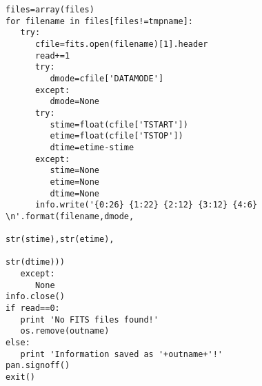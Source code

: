 \begin{verbatim}
files=array(files)
for filename in files[files!=tmpname]:
   try:
      cfile=fits.open(filename)[1].header
      read+=1
      try:
         dmode=cfile['DATAMODE']
      except:
         dmode=None
      try:
         stime=float(cfile['TSTART'])
         etime=float(cfile['TSTOP'])
         dtime=etime-stime
      except:
         stime=None
         etime=None
         dtime=None
      info.write('{0:26} {1:22} {2:12} {3:12} {4:6} \n'.format(filename,dmode,
                                                               str(stime),str(etime),
                                                               str(dtime)))
   except:
      None
info.close()
if read==0:
   print 'No FITS files found!'
   os.remove(outname)
else:
   print 'Information saved as '+outname+'!'
pan.signoff()
exit()

\end{verbatim}